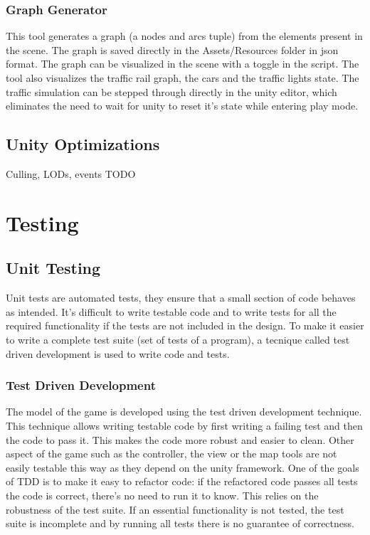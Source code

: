 \documentclass{article}
\begin{document}
\subsubsection{Graph Generator}
This tool generates a graph (a nodes and arcs tuple) from the elements present in the scene. The graph is saved directly in the Assets/Resources folder in json format. The graph can be visualized in the scene with a toggle in the script. The tool also visualizes the traffic rail graph, the cars and the traffic lights state. The traffic simulation can be stepped through directly in the unity editor, which eliminates the need to wait for unity to reset it's state while entering play mode.

\subsection{Unity Optimizations}
Culling, LODs, events
TODO

\clearpage

\section{Testing}
\subsection{Unit Testing}
Unit tests are automated tests, they ensure that a small section of code behaves as intended. It's difficult to write testable code and to write tests for all the required functionality if the tests are not included in the design. To make it easier to write a complete test suite (set of tests of a program), a tecnique called test driven development is used to write code and tests.
\subsubsection {Test Driven Development \cite{tdd}} 
The model of the game is developed using the test driven development technique. This technique allows writing testable code by first writing a failing test and then the code to pass it. This makes the code more robust and easier to clean. Other aspect of the game such as the controller, the view or the map tools are not easily testable this way as they depend on the unity framework. One of the goals of TDD is to make it easy to refactor code: if the refactored code passes all tests the code is correct, there's no need to run it to know. This relies on the robustness of the test suite. If an essential functionality is not tested, the test suite is incomplete and by running all tests there is no guarantee of correctness.
\end{document}
